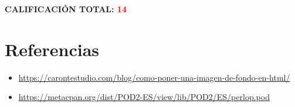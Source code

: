 \documentclass{article}
\begin{document}
       \vspace{0.3cm}
    
            \textbf{\Large CALIFICACIÓN TOTAL: \textcolor{red}{14}} 
        
        \section{Referencias}
        \begin{itemize}			
        	\item \url{https://carontestudio.com/blog/como-poner-una-imagen-de-fondo-en-html/}
        	\item \url{https://metacpan.org/dist/POD2-ES/view/lib/POD2/ES/perlop.pod}
        \end{itemize}	
     
\end{document}
